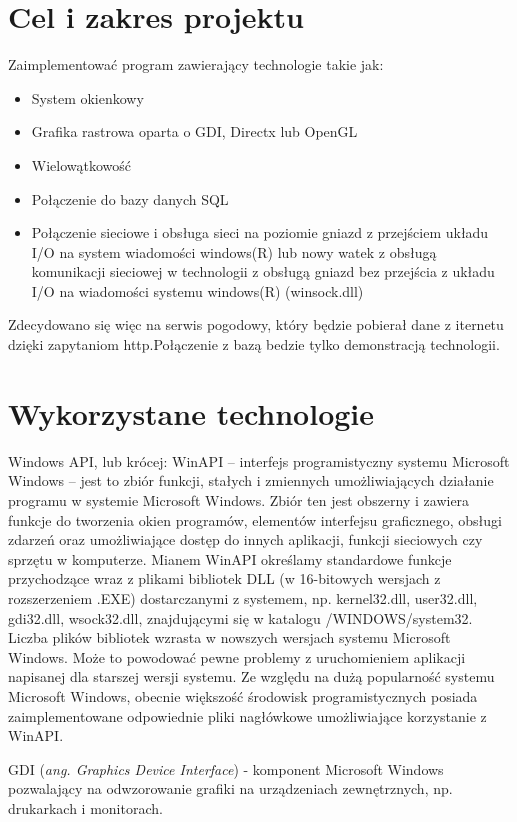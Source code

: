 \documentclass[a4paper,twoside,12pt]{mgr}
\newcommand{\eng}[1]{(\emph{#1})}
\begin{document}
\stronaTytulowa

\tableofcontents
\chapter{Cel i zakres projektu}
Zaimplementować program zawierający technologie takie jak:
\begin{itemize}
\item System okienkowy
\item Grafika rastrowa oparta o GDI, Directx lub OpenGL
\item Wielowątkowość
\item Połączenie do bazy danych SQL
\item Połączenie sieciowe i obsługa sieci na poziomie gniazd z przejściem układu I/O na system wiadomości  windows(R) lub nowy watek z obsługą komunikacji sieciowej w technologii z obsługą gniazd bez przejścia z układu I/O na wiadomości systemu windows(R) (winsock.dll)  
\end{itemize}
Zdecydowano się więc na serwis pogodowy, który będzie pobierał dane z iternetu dzięki zapytaniom http.Połączenie z bazą bedzie tylko demonstracją technologii.


\chapter{Wykorzystane technologie}
Windows API, lub krócej: WinAPI – interfejs programistyczny systemu Microsoft Windows – jest to zbiór funkcji, stałych i zmiennych umożliwiających działanie programu w systemie Microsoft Windows.
Zbiór ten jest obszerny i zawiera funkcje do tworzenia okien programów, elementów interfejsu graficznego, obsługi zdarzeń oraz umożliwiające dostęp do innych aplikacji, funkcji sieciowych czy sprzętu w komputerze. Mianem WinAPI określamy standardowe funkcje przychodzące wraz z plikami bibliotek DLL (w 16-bitowych wersjach z rozszerzeniem .EXE) dostarczanymi z systemem, np. kernel32.dll, user32.dll, gdi32.dll, wsock32.dll, znajdującymi się w katalogu /WINDOWS/system32. Liczba plików bibliotek wzrasta w nowszych wersjach systemu Microsoft Windows. Może to powodować pewne problemy z uruchomieniem aplikacji napisanej dla starszej wersji systemu. Ze względu na dużą popularność systemu Microsoft Windows, obecnie większość środowisk programistycznych posiada zaimplementowane odpowiednie pliki nagłówkowe umożliwiające korzystanie z WinAPI.

GDI \eng{ang. Graphics Device Interface} - komponent Microsoft Windows pozwalający na odwzorowanie grafiki na urządzeniach zewnętrznych, np. drukarkach i monitorach.
\end{document}
